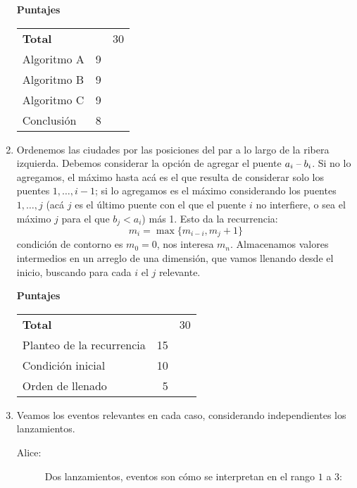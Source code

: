 \documentclass[english, spanish, fleqn]{article}
\begin{document}
\begin{enumerate}
    \vspace*{2\baselineskip}
    \begin{minipage}{1.0\linewidth}
      {\Large\textbf{Puntajes}}\\[0.5\baselineskip]
      \begin{tabular}{lrr}
	\textbf{Total}					     &	  & 30 \\
	Algoritmo A					     &	9 &    \\
	Algoritmo B					     &	9 &    \\
	Algoritmo C					     &	9 &    \\
	Conclusión					     &	8 &
      \end{tabular}
    \end{minipage}
\pagebreak[4]
  \item %
    Ordenemos las ciudades
    por las posiciones del par a lo largo de la ribera izquierda.
    Debemos considerar
    la opción de agregar el puente \(a_i \text{\;--\;} b_i\).
    Si no lo agregamos,
    el máximo hasta acá es el que resulta
    de considerar solo los puentes \(1, \dotsc, i - 1\);
    si lo agregamos es el máximo considerando los puentes \(1, \dotsc, j\)
    (acá \(j\) es el último puente con el que el puente \(i\) no interfiere,
     o sea el máximo \(j\) para el que \(b_j < a_i\))
    más 1.
    Esto da la recurrencia:
    \begin{equation*}
      m_i
	= \max \{ m_{i - i}, m_j + 1 \}
    \end{equation*}
    condición de contorno es \(m_0 = 0\),
    nos interesa \(m_n\).
    Almacenamos valores intermedios en un arreglo de una dimensión,
    que vamos llenando desde el inicio,
    buscando para cada \(i\) el \(j\) relevante.

    \vspace*{2\baselineskip}
    \begin{minipage}{1.0\linewidth}
      {\Large\textbf{Puntajes}}\\[0.5\baselineskip]
      \begin{tabular}{lrr}
	\textbf{Total}					     &	  & 30 \\
	Planteo de la recurrencia			     & 15 &    \\
	Condición inicial				     & 10 &    \\
	Orden de llenado				     &	5 &
      \end{tabular}
    \end{minipage}
\pagebreak[4]
  \item %
    Veamos los eventos relevantes en cada caso,
    considerando independientes los lanzamientos.
    \begin{description}
    \item[Alice:]
      Dos lanzamientos,
      eventos son cómo se interpretan en el rango \(1\) a \(3\):


\end{description}
\end{enumerate}
\end{document}
